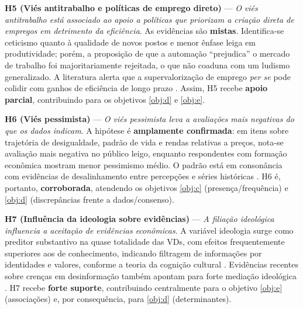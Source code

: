 \textbf{H5 (Viés antitrabalho e políticas de emprego direto)} — \textit{O viés antitrabalho está associado ao apoio a políticas que priorizam a criação direta de empregos em detrimento da eficiência}. As evidências são \textbf{mistas}. Identifica-se ceticismo quanto à qualidade de novos postos e menor ênfase leiga em produtividade; porém, a proposição de que a automação “prejudica” o mercado de trabalho foi majoritariamente rejeitada, o que não coaduna com um ludismo generalizado. A literatura alerta que a supervalorização de emprego \emph{per se} pode colidir com ganhos de eficiência de longo prazo \cite{landsburg2012armchair,sowell2007conflict}. Assim, H5 recebe \textbf{apoio parcial}, contribuindo para os objetivos \autoref{obj:d} e \autoref{obj:e}.

\textbf{H6 (Viés pessimista)} — \textit{O viés pessimista leva a avaliações mais negativas do que os dados indicam}. A hipótese é \textbf{amplamente confirmada}: em itens sobre trajetória de desigualdade, padrão de vida e rendas relativas a preços, nota-se avaliação mais negativa no público leigo, enquanto respondentes com formação econômica mostram menor pessimismo médio. O padrão está em consonância com evidências de desalinhamento entre percepções e séries históricas \cite{easterbrook2004progress, ridleyotimista}. H6 é, portanto, \textbf{corroborada}, atendendo os objetivos \autoref{obj:c} (presença/frequência) e \autoref{obj:d} (discrepâncias frente a dados/consenso).

\textbf{H7 (Influência da ideologia sobre evidências)} — \textit{A filiação ideológica influencia a aceitação de evidências econômicas}. A variável ideologia surge como preditor substantivo na quase totalidade das VDs, com efeitos frequentemente superiores aos de conhecimento, indicando filtragem de informações por identidades e valores, conforme a teoria da cognição cultural \cite{kahan2012polarization}. Evidências recentes sobre crenças em desinformação também apontam para forte mediação ideológica \cite{rossini2023explaining}. H7 recebe \textbf{forte suporte}, contribuindo centralmente para o objetivo \autoref{obj:e} (associações) e, por consequência, para \autoref{obj:d} (determinantes).

